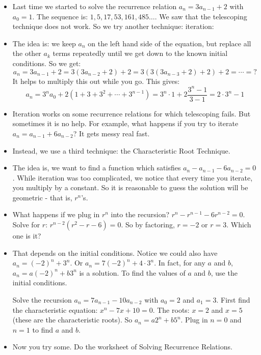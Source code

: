 \begin{itemize}
  \item Last time we started to solve the recurrence relation $a_n = 3a_{n-1} + 2$ with $a_0 = 1$.  The sequence is: $1, 5, 17, 53, 161, 485\ldots$.   We saw that the telescoping technique does not work.  So we try another technique: iteration:
  
  \item The idea is: we keep $a_n$ on the left hand side of the equation, but replace all the other $a_k$ terms repeatedly until we get down to the known initial conditions.  So we get: 
   \[a_n = 3a_{n-1} + 2 = 3(3a_{n-2} + 2) + 2 = 3(3(3a_{n-3} + 2) + 2) + 2 = \cdots = ?\]
 It helps to multiply this out while you go.  This gives:
 \[a_n = 3^n a_0 + 2(1 + 3 + 3^2 + \cdots + 3^{n-1}) = 3^n\cdot 1 + 2\frac{3^n - 1}{3-1} = 2\cdot 3^n - 1 \]
 
 \item Iteration works on some recurrence relations for which telescoping fails.  But sometimes it is no help.  For example, what happens if you try to iterate $a_n = a_{n-1} + 6a_{n-2}$?  It gets messy real fast.
 
 \item Instead, we use a third technique: the Characteristic Root Technique.
 
 \item The idea is, we want to find a function which satisfies $a_n - a_{n-1} - 6a_{n-2} = 0$.  While iteration was too complicated, we notice that every time you iterate, you multiply by a constant.  So it is reasonable to guess the solution will be geometric - that is, $r^n$'s.
 
 \item What happens if we plug in $r^n$ into the recursion?   $r^n - r^{n-1} - 6r^{n-2} = 0$.  Solve for $r$: $r^{n-2}(r^2 - r - 6) = 0$.  So by factoring, $r = -2$ or $r = 3$.  Which one is it?
 
 \item That depends on the initial conditions.  Notice we could also have $a_n = (-2)^n + 3^n$.  Or $a_n = 7(-2)^n + 4\cdot 3^n$.  In fact, for any $a$ and $b$, $a_n = a(-2)^n + b 3^n$ is a solution.  To find the values of $a$ and $b$, use the initial conditions.
 
 \ex Solve the recursion $a_n = 7a_{n-1} - 10 a_{n-2}$ with $a_0 = 2$ and $a_1 = 3$.  First find the characteristic equation: $x^n - 7x + 10 = 0$.  The roots: $x = 2$ and $x = 5$ (these are the characteristic roots).  So $a_n = a 2^n + b 5^n$.  Plug in $n = 0$ and $n = 1$ to find $a$ and $b$.
 
 \item Now you try some.  Do the worksheet of Solving Recurrence Relations.
 
\end{itemize}




